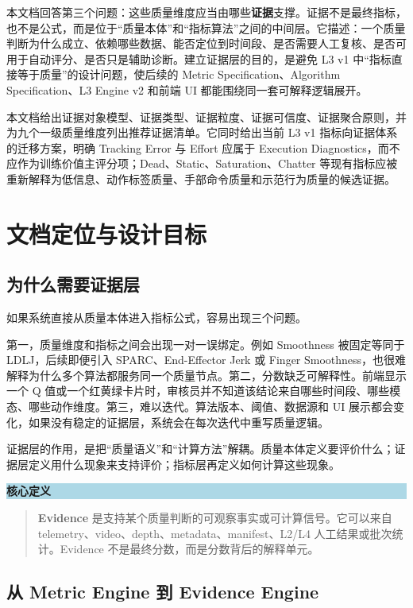 \documentclass[UTF8,zihao=-4]{ctexart}
\newcommand{\Term}[1]{\textbf{#1}}
\newenvironment{notebox}[1]{\vspace{0.5em}\noindent\colorbox{LightBlue}{\parbox{0.96\linewidth}{\textbf{#1}}}\par\vspace{-0.2em}\begin{quote}\small}{\end{quote}\vspace{0.3em}}
\begin{document}
本文档回答第三个问题：这些质量维度应当由哪些\Term{证据}支撑。证据不是最终指标，也不是公式，而是位于“质量本体”和“指标算法”之间的中间层。它描述：一个质量判断为什么成立、依赖哪些数据、能否定位到时间段、是否需要人工复核、是否可用于自动评分、是否只是辅助诊断。建立证据层的目的，是避免 L3 v1 中“指标直接等于质量”的设计问题，使后续的 Metric Specification、Algorithm Specification、L3 Engine v2 和前端 UI 都能围绕同一套可解释逻辑展开。

本文档给出证据对象模型、证据类型、证据粒度、证据可信度、证据聚合原则，并为九个一级质量维度列出推荐证据清单。它同时给出当前 L3 v1 指标向证据体系的迁移方案，明确 Tracking Error 与 Effort 应属于 Execution Diagnostics，而不应作为训练价值主评分项；Dead、Static、Saturation、Chatter 等现有指标应被重新解释为低信息、动作标签质量、手部命令质量和示范行为质量的候选证据。

\section{文档定位与设计目标}

\subsection{为什么需要证据层}

如果系统直接从质量本体进入指标公式，容易出现三个问题。

第一，质量维度和指标之间会出现一对一误绑定。例如 Smoothness 被固定等同于 LDLJ，后续即便引入 SPARC、End-Effector Jerk 或 Finger Smoothness，也很难解释为什么多个算法都服务同一个质量节点。第二，分数缺乏可解释性。前端显示一个 Q 值或一个红黄绿卡片时，审核员并不知道该结论来自哪些时间段、哪些模态、哪些动作维度。第三，难以迭代。算法版本、阈值、数据源和 UI 展示都会变化，如果没有稳定的证据层，系统会在每次迭代中重写质量逻辑。

证据层的作用，是把“质量语义”和“计算方法”解耦。质量本体定义要评价什么；证据层定义用什么现象来支持评价；指标层再定义如何计算这些现象。

\begin{notebox}{核心定义}
\Term{Evidence} 是支持某个质量判断的可观察事实或可计算信号。它可以来自 telemetry、video、depth、metadata、manifest、L2/L4 人工结果或批次统计。Evidence 不是最终分数，而是分数背后的解释单元。
\end{notebox}

\subsection{从 Metric Engine 到 Evidence Engine}
\end{document}
